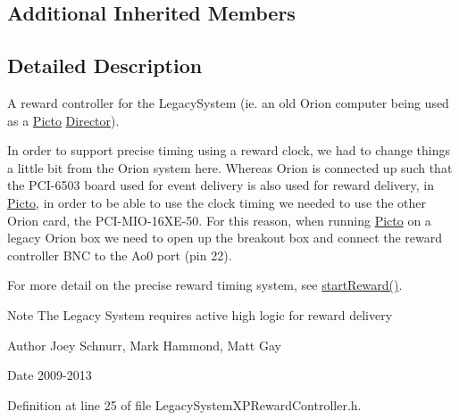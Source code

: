 \subsection*{Additional Inherited Members}


\subsection{Detailed Description}
A reward controller for the Legacy\-System (ie. an old Orion computer being used as a \hyperlink{namespace_picto}{Picto} \hyperlink{class_director}{Director}). 

In order to support precise timing using a reward clock, we had to change things a little bit from the Orion system here. Whereas Orion is connected up such that the P\-C\-I-\/6503 board used for event delivery is also used for reward delivery, in \hyperlink{namespace_picto}{Picto}, in order to be able to use the clock timing we needed to use the other Orion card, the P\-C\-I-\/\-M\-I\-O-\/16\-X\-E-\/50. For this reason, when running \hyperlink{namespace_picto}{Picto} on a legacy Orion box we need to open up the breakout box and connect the reward controller B\-N\-C to the Ao0 port (pin 22).

For more detail on the precise reward timing system, see \hyperlink{class_picto_1_1_legacy_system_x_p_reward_controller_a144f530dcb20520deb10666510614e14}{start\-Reward()}.

\begin{DoxyNote}{Note}
The Legacy System requires active high logic for reward delivery 
\end{DoxyNote}
\begin{DoxyAuthor}{Author}
Joey Schnurr, Mark Hammond, Matt Gay 
\end{DoxyAuthor}
\begin{DoxyDate}{Date}
2009-\/2013 
\end{DoxyDate}


Definition at line 25 of file Legacy\-System\-X\-P\-Reward\-Controller.\-h.



